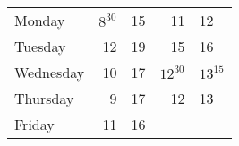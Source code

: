 \documentclass{article}
\begin{document}
\vspace*{\fill} \vspace*{-5ex}

\begin{tabular}{lr@{--}l@{\qquad Lunch \quad}r@{--}l}
Monday & $8^{30}$ & 15 & 11 & 12 \\
Tuesday & 12 & 19 & 15 & 16 \\
Wednesday & 10 & 17 & $12^{30}$ & $13^{15}$ \\
Thursday & 9 & 17 & 12 & 13 \\
Friday & 11 & 16 & &\\
\end{tabular}

\vspace*{\fill}
\end{document}
